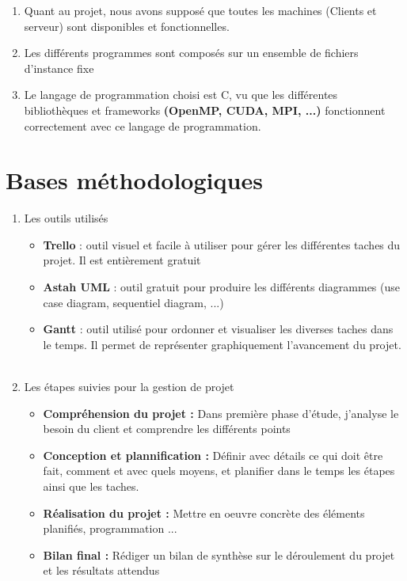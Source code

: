 \documentclass{polytech/polytech}
\begin{document}
        \begin{enumerate}
            \item Quant au projet, nous avons supposé que toutes les machines (Clients et serveur) sont disponibles et fonctionnelles.\\
            \item Les différents programmes sont composés sur un ensemble de fichiers d'instance fixe\\
            \item Le langage de programmation choisi est C, vu que les différentes bibliothèques et frameworks \textbf{(OpenMP, CUDA, MPI, ...)} fonctionnent correctement avec ce langage de programmation.
        \end{enumerate}
        
        \section{Bases méthodologiques}
        
        \begin{enumerate}
            \item Les outils utilisés
            \begin{itemize}
                \item \textbf{Trello} : outil visuel et facile à utiliser pour gérer les différentes taches du projet. Il est entièrement gratuit
                \item \textbf{Astah UML} : outil gratuit pour produire les différents diagrammes (use case diagram, sequentiel diagram, ...)
                \item \textbf{Gantt} : outil utilisé pour ordonner et visualiser les diverses taches dans le temps. Il permet de représenter graphiquement l'avancement du projet.\\\\
            \end{itemize}
            \item Les étapes suivies pour la gestion de projet
            \begin{itemize}
                \item \textbf{Compréhension du projet : }
                Dans première phase d'étude, j'analyse le besoin du client et comprendre les différents points
                \item \textbf{Conception et plannification : }
                Définir avec détails ce qui doit être fait, comment et avec quels moyens, et planifier dans le temps les étapes ainsi que les taches.
                \item \textbf{Réalisation du projet : }
                Mettre en oeuvre concrète des éléments planifiés, programmation ...
                \item \textbf{Bilan final : }
                Rédiger un bilan de synthèse sur le déroulement du projet et les résultats attendus\\
            \end{itemize}
        \end{enumerate}
        
\end{document}
